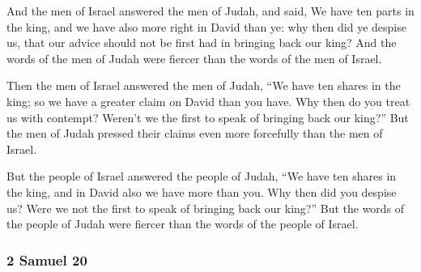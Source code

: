 			\begin{versebox}
					\item[BHS] 
					\item[ASV] And the men of Israel answered the men of Judah, and said, We have ten parts in the king, and we have also more right in David than ye: why then did ye despise us, that our advice should not be first had in bringing back our king? And the words of the men of Judah were fiercer than the words of the men of Israel.
					\item[NIV] Then the men of Israel answered the men of Judah, “We have ten shares in the king; so we have a greater claim on David than you have. Why then do you treat us with contempt? Weren’t we the first to speak of bringing back our king?” But the men of Judah pressed their claims even more forcefully than the men of Israel.
					\item[NRSV] But the people of Israel answered the people of Judah, “We have ten shares in the king, and in David also we have more than you. Why then did you despise us? Were we not the first to speak of bringing back our king?” But the words of the people of Judah were fiercer than the words of the people of Israel.
			\end{versebox}
	\subsubsection{2 Samuel 20} %
		\label{2SAMUEL-20}

